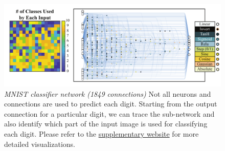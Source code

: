 
\begin{figure}[ht!]
\vskip -0.05in %
    \centering        
    \includegraphics[width=1.0\textwidth]{img/champ_mnist_reduce_small.pdf}   
\vskip -0.05in %
    \caption      
    {     
	\textit{MNIST classifier network (1849 connections)}
	\newline
	Not all neurons and connections are used to predict each digit. Starting from the output connection for a particular digit, we can trace the sub-network and also identify which part of the input image is used for classifying each digit. Please refer to the \href{\websiteurl}{supplementary website} for more detailed visualizations. 
    }         
    \label{fig:mnistfull}
\vskip -0.15in %
\end{figure}
